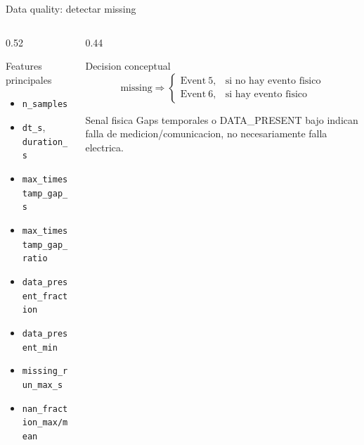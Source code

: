 \documentclass[10pt,aspectratio=169]{beamer}
\newcommand{\code}[1]{\texttt{\footnotesize #1}}
\begin{document}
\begin{frame}{Data quality: detectar missing}
\small
\begin{columns}[T,totalwidth=\textwidth]
\begin{column}{0.52\textwidth}
\begin{block}{Features principales}
\begin{itemize}
  \item \code{n\_samples}
  \item \code{dt\_s}, \code{duration\_s}
  \item \code{max\_timestamp\_gap\_s}
  \item \code{max\_timestamp\_gap\_ratio}
  \item \code{data\_present\_fraction}
  \item \code{data\_present\_min}
  \item \code{missing\_run\_max\_s}
  \item \code{nan\_fraction\_max/mean}
\end{itemize}
\end{block}
\end{column}
\begin{column}{0.44\textwidth}
\begin{alertblock}{Decision conceptual}
\[
\mathrm{missing} \Rightarrow
\begin{cases}
\mathrm{Event\ 5}, & \text{si no hay evento fisico}\\
\mathrm{Event\ 6}, & \text{si hay evento fisico}
\end{cases}
\]
\end{alertblock}
\begin{exampleblock}{Senal fisica}
Gaps temporales o DATA\_PRESENT bajo indican falla de medicion/comunicacion, no necesariamente falla electrica.
\end{exampleblock}
\end{column}
\end{columns}
\end{frame}
\end{document}
